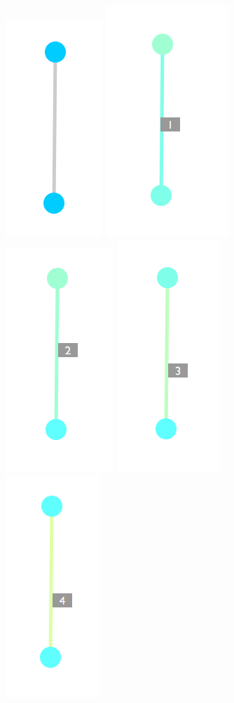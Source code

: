\documentclass[aps,prd,final,twocolumn,letterpaper,nofootinbib]{revtex4-1}
\begin{document}
\begin{figure}[h]
   \centering
   \includegraphics[width=.19\linewidth]{img/l1}
   \includegraphics[width=.19\linewidth]{img/l2}
   \includegraphics[width=.19\linewidth]{img/l3}
   \includegraphics[width=.19\linewidth]{img/l4}
   \includegraphics[width=.19\linewidth]{img/l5}

\end{figure}
\end{document}
